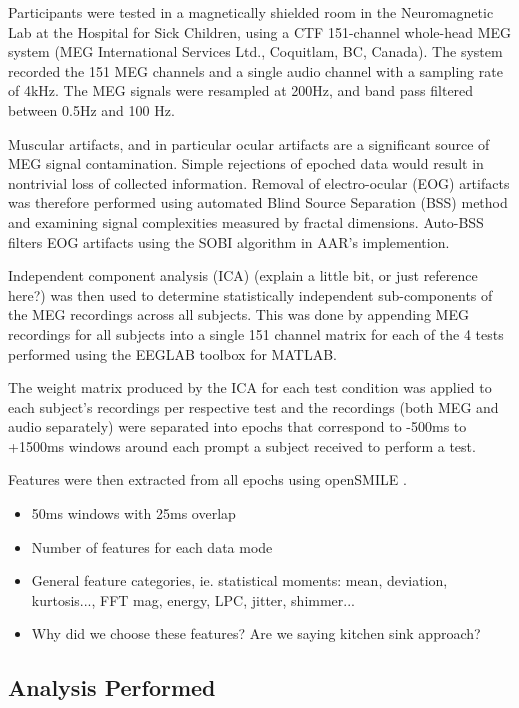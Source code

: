 \documentclass[a4paper]{article}
\begin{document}
Participants were tested in a magnetically shielded room in the Neuromagnetic Lab at the Hospital for Sick Children, using a CTF 151-channel whole-head MEG system (MEG International Services Ltd., Coquitlam, BC, Canada). The system recorded the 151 MEG channels and a single audio channel with a sampling rate of 4kHz. The MEG signals were resampled at 200Hz, and band pass filtered between 0.5Hz and 100 Hz.

Muscular artifacts, and in particular ocular artifacts are a significant source of MEG signal contamination. Simple rejections of epoched data would result in nontrivial loss of collected information. Removal of electro-ocular (EOG) artifacts was therefore performed using automated Blind Source Separation (BSS) method and examining signal complexities measured by fractal dimensions. Auto-BSS filters EOG artifacts using the SOBI algorithm in AAR's implemention.

Independent component analysis (ICA) (explain a little bit, or just reference here?) was then used to determine statistically independent sub-components of the MEG recordings across all subjects. This was done by appending MEG recordings for all subjects into a single 151 channel matrix for each of the 4 tests performed using the EEGLAB toolbox \cite{Delorme04eeglab} for MATLAB.

The weight matrix produced by the ICA for each test condition was applied to each subject's recordings per respective test and the recordings (both MEG and audio separately) were separated into epochs that correspond to -500ms to +1500ms windows around each prompt a subject received to perform a test.

Features were then extracted from all epochs using openSMILE \cite{Eyben13-RDI}. 

\begin{itemize}
\item 50ms windows with 25ms overlap  
\item Number of features for each data mode
\item General feature categories, ie. statistical moments: mean, deviation, kurtosis..., FFT mag, energy,
  LPC, jitter, shimmer...
\item Why did we choose these features? Are we saying kitchen sink approach?
\end{itemize}

\subsection{Analysis Performed}
\end{document}
